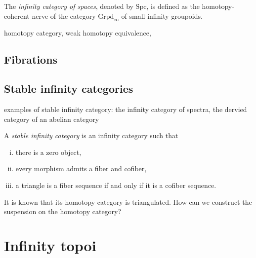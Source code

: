 \documentclass{../../large}
\begin{document}
The \emph{infinity category of spaces}, denoted by $\mathrm{Spc}$, is defined as the homotopy-coherent nerve of the category $\mathrm{Grpd}_\infty$ of small infinity groupoids.

\begin{prb}
homotopy category, weak homotopy equivalence, 
\end{prb}


\section{Fibrations}



\section{Stable infinity categories}

examples of stable infinity category: the infinity category of spectra, the dervied category of an abelian category

\begin{prb}
A \emph{stable infinity category} is an infinity category such that
\begin{enumerate}[(i)]
\item there is a zero object,
\item every morphism admits a fiber and cofiber,
\item a triangle is a fiber sequence if and only if it is a cofiber sequence.
\end{enumerate}
It is known that its homotopy category is triangulated.
How can we construct the suspension on the homotopy category?
\end{prb}


\begin{prb}
\end{prb}









\chapter{Infinity topoi}
\end{document}
